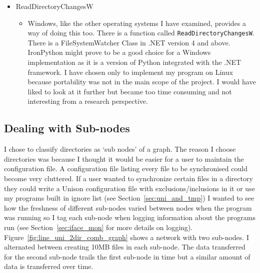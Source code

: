 \documentclass[12pt]{article}
\begin{document}
\begin{itemize}
    \item ReadDirectoryChangesW
        \begin{itemize}
        \item Windows, like the other operating systems
        I have examined, provides a way of doing this
        too. There is a function called \texttt{ReadDirectoryChangesW}.
        There is a FileSystemWatcher Class in .NET version 4 and
        above. IronPython might prove to be a good choice for a
        Windows implementation as it is a version of Python integrated
        with the .NET framework. I have chosen only to implement
        my program on Linux because portability was not in the main
        scope of the project. I would have liked to look
        at it further but became too time consuming and not interesting
        from a research perspective.
        \end{itemize}
\end{itemize}

\subsection{Dealing with Sub-nodes}
\label{sec:subnodes}
I chose to classify directories as `sub nodes' of a graph. 
The reason I choose directories was because I thought it
would be easier for a user to maintain the configuration file.
A configuration file listing every file to be synchronised could
become very cluttered.
If a user wanted to synchronize
certain files in a directory they could write a Unison configuration file with 
exclusions/inclusions in it or use my programs built in ignore
list (see Section~\ref{sec:uni_and_tmp})
I wanted to see how the freshness of different
sub-nodes varied between nodes when the program was running so I tag
each sub-node when logging information about the programs run 
(see Section~\ref{sec:iface_mon} for more
details on logging). Figure~\ref{fig:line_uni_2dir_comb_graph}
shows a network with two sub-nodes. I alternated between creating
10MB files in each sub-node. The data transferred for the second
sub-node trails the first sub-node in time but a similar amount
of data is transferred over time.
\end{document}
